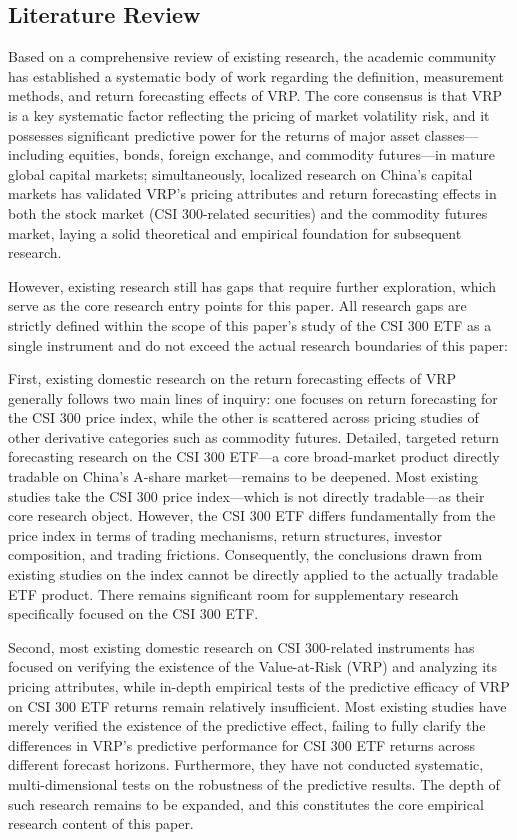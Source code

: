 \documentclass[a4paper, 12pt]{article}    %
\begin{document}
\subsection{Literature Review}

Based on a comprehensive review of existing research, the academic community has established a systematic body of work regarding the definition, measurement methods, and return forecasting effects of VRP. The core consensus is that VRP is a key systematic factor reflecting the pricing of market volatility risk, and it possesses significant predictive power for the returns of major asset classes—including equities, bonds, foreign exchange, and commodity futures—in mature global capital markets; simultaneously, localized research on China’s capital markets has validated VRP’s pricing attributes and return forecasting effects in both the stock market (CSI 300-related securities) and the commodity futures market, laying a solid theoretical and empirical foundation for subsequent research.

However, existing research still has gaps that require further exploration, which serve as the core research entry points for this paper. All research gaps are strictly defined within the scope of this paper’s study of the CSI 300 ETF as a single instrument and do not exceed the actual research boundaries of this paper:

First, existing domestic research on the return forecasting effects of VRP generally follows two main lines of inquiry: one focuses on return forecasting for the CSI 300 price index, while the other is scattered across pricing studies of other derivative categories such as commodity futures. Detailed, targeted return forecasting research on the CSI 300 ETF—a core broad-market product directly tradable on China’s A-share market—remains to be deepened. Most existing studies take the CSI 300 price index—which is not directly tradable—as their core research object. However, the CSI 300 ETF differs fundamentally from the price index in terms of trading mechanisms, return structures, investor composition, and trading frictions. Consequently, the conclusions drawn from existing studies on the index cannot be directly applied to the actually tradable ETF product. There remains significant room for supplementary research specifically focused on the CSI 300 ETF.

Second, most existing domestic research on CSI 300-related instruments has focused on verifying the existence of the Value-at-Risk (VRP) and analyzing its pricing attributes, while in-depth empirical tests of the predictive efficacy of VRP on CSI 300 ETF returns remain relatively insufficient. Most existing studies have merely verified the existence of the predictive effect, failing to fully clarify the differences in VRP’s predictive performance for CSI 300 ETF returns across different forecast horizons. Furthermore, they have not conducted systematic, multi-dimensional tests on the robustness of the predictive results. The depth of such research remains to be expanded, and this constitutes the core empirical research content of this paper.
\end{document}
